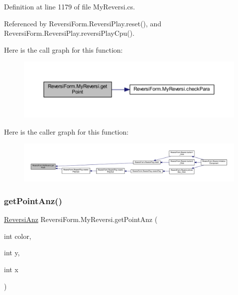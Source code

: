 Definition at line 1179 of file My\+Reversi.\+cs.



Referenced by Reversi\+Form.\+Reversi\+Play.\+reset(), and Reversi\+Form.\+Reversi\+Play.\+reversi\+Play\+Cpu().

Here is the call graph for this function\+:
\nopagebreak
\begin{figure}[H]
\begin{center}
\leavevmode
\includegraphics[width=350pt]{class_reversi_form_1_1_my_reversi_a58150a220368d7d7ae8ad01ee0120e71_cgraph}
\end{center}
\end{figure}
Here is the caller graph for this function\+:
\nopagebreak
\begin{figure}[H]
\begin{center}
\leavevmode
\includegraphics[width=350pt]{class_reversi_form_1_1_my_reversi_a58150a220368d7d7ae8ad01ee0120e71_icgraph}
\end{center}
\end{figure}
\mbox{\label{class_reversi_form_1_1_my_reversi_af0170bf211a996c2285d0db926f2f0ae}} 
\subsubsection{\texorpdfstring{get\+Point\+Anz()}{getPointAnz()}}
{\footnotesize\ttfamily \hyperlink{class_reversi_form_1_1_reversi_anz}{Reversi\+Anz} Reversi\+Form.\+My\+Reversi.\+get\+Point\+Anz (\begin{DoxyParamCaption}\item[{int}]{color,  }\item[{int}]{y,  }\item[{int}]{x }\end{DoxyParamCaption})}



